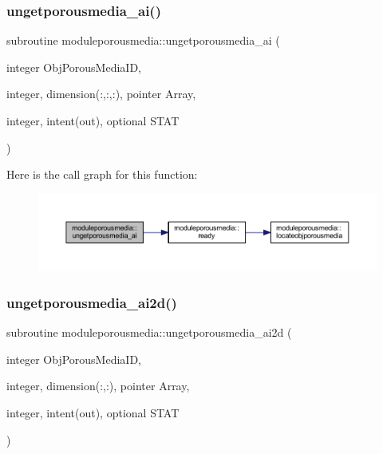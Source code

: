 \subsubsection{\texorpdfstring{ungetporousmedia\+\_\+ai()}{ungetporousmedia\_ai()}}
{\footnotesize\ttfamily subroutine moduleporousmedia\+::ungetporousmedia\+\_\+ai (\begin{DoxyParamCaption}\item[{integer}]{Obj\+Porous\+Media\+ID,  }\item[{integer, dimension(\+:,\+:,\+:), pointer}]{Array,  }\item[{integer, intent(out), optional}]{S\+T\+AT }\end{DoxyParamCaption})\hspace{0.3cm}{\ttfamily [private]}}

Here is the call graph for this function\+:\nopagebreak
\begin{figure}[H]
\begin{center}
\leavevmode
\includegraphics[width=350pt]{namespacemoduleporousmedia_ad36e11e27240926924cf03325b9a47bc_cgraph}
\end{center}
\end{figure}
\mbox{\label{namespacemoduleporousmedia_a287c849b30a2dc7af1280cf983edfb8d}} 
\subsubsection{\texorpdfstring{ungetporousmedia\+\_\+ai2d()}{ungetporousmedia\_ai2d()}}
{\footnotesize\ttfamily subroutine moduleporousmedia\+::ungetporousmedia\+\_\+ai2d (\begin{DoxyParamCaption}\item[{integer}]{Obj\+Porous\+Media\+ID,  }\item[{integer, dimension(\+:,\+:), pointer}]{Array,  }\item[{integer, intent(out), optional}]{S\+T\+AT }\end{DoxyParamCaption})\hspace{0.3cm}{\ttfamily [private]}}

